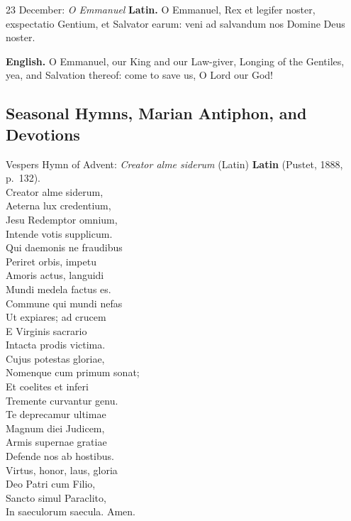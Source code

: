 \begin{massbox}{23 December: \textit{O Emmanuel}}
\textbf{Latin.} O Emmanuel, Rex et legifer noster, exspectatio Gentium, et
Salvator earum: veni ad salvandum nos Domine Deus noster.

\textbf{English.} O Emmanuel, our King and our Law-giver, Longing of the
Gentiles, yea, and Salvation thereof: come to save us, O Lord our God!
\end{massbox}

\subsection{Seasonal Hymns, Marian Antiphon, and Devotions}

\begin{massbox}{Vespers Hymn of Advent: \textit{Creator alme siderum} (Latin)}
\textbf{Latin} (Pustet, 1888, p.~132).\\
Creator alme siderum,\\
Aeterna lux credentium,\\
Jesu Redemptor omnium,\\
Intende votis supplicum.\\[0.4em]
Qui daemonis ne fraudibus\\
Periret orbis, impetu\\
Amoris actus, languidi\\
Mundi medela factus es.\\[0.4em]
Commune qui mundi nefas\\
Ut expiares; ad crucem\\
E Virginis sacrario\\
Intacta prodis victima.\\[0.4em]
Cujus potestas gloriae,\\
Nomenque cum primum sonat;\\
Et coelites et inferi\\
Tremente curvantur genu.\\[0.4em]
Te deprecamur ultimae\\
Magnum diei Judicem,\\
Armis supernae gratiae\\
Defende nos ab hostibus.\\[0.4em]
Virtus, honor, laus, gloria\\
Deo Patri cum Filio,\\
Sancto simul Paraclito,\\
In saeculorum saecula. Amen.
\end{massbox}

